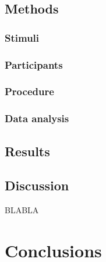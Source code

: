 \subsection{Methods}
\subsubsection{Stimuli}
\subsubsection{Participants}
\subsubsection{Procedure}
\subsubsection{Data analysis}
\subsection{Results}
\subsection{Discussion}

BLABLA
\section{Conclusions}



